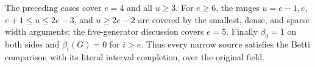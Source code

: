 The preceding cases cover $e=4$ and all $u\ge3$.
For $e\ge6$, the ranges $u=e-1,e$, $e+1\le u\le2e-3$, and
$u\ge2e-2$ are covered by the smallest, dense, and sparse width
arguments; the five-generator discussion covers $e=5$.
Finally $\beta_0=1$ on both sides and $\beta_i(G)=0$ for $i>e$.
Thus every narrow source satisfies the Betti comparison with its
literal interval completion, over the original field.
